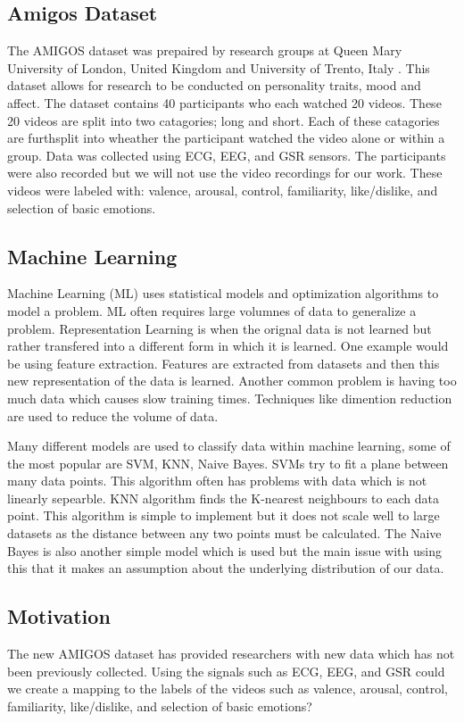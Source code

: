 \subsection{Amigos Dataset}
The AMIGOS dataset was prepaired by research groups at
Queen Mary University of London, United Kingdom and
University of Trento, Italy \cite{AMIGOS:2018}.
This dataset allows for research to be conducted on
personality traits, mood and affect.
The dataset contains 40 participants who each watched 20 videos.
These 20 videos are split into two catagories; long and short.
Each of these catagories are furthsplit into
wheather the participant watched the video alone or within a group.
Data was collected using ECG, EEG, and GSR sensors.
The participants were also recorded but we will not use the video recordings
for our work.
These videos were labeled with:
valence, arousal, control, familiarity, like/dislike,
and selection of basic emotions.

\subsection{Machine Learning}
Machine Learning (ML) uses statistical models and
optimization algorithms to model a problem.
ML often requires large volumnes of data to generalize a problem.
Representation Learning is when the orignal data is not learned
but rather transfered into a different form in which it is learned.
One example would be using feature extraction.
Features are extracted from datasets and then this new representation of the data
is learned.
Another common problem is having too much data which causes slow training times.
Techniques like dimention reduction are used to reduce the volume of
data.

Many different models are used to classify data within machine learning,
some of the most popular are SVM, KNN, Naive Bayes.
SVMs try to fit a plane between many data points.
This algorithm often has problems with data which is not
linearly sepearble.
KNN algorithm finds the K-nearest neighbours to each data point.
This algorithm is simple to implement but it does not scale well
to large datasets as the distance between any two points must be calculated.
The Naive Bayes is also another simple model which is used but the main issue
with using this that it makes an assumption about the underlying distribution of
our data.

\subsection{Motivation}
The new AMIGOS dataset has provided researchers with new
data which has not been previously collected.
Using the signals such as ECG, EEG, and GSR
could we create a mapping to the
labels of the videos such as
valence, arousal, control, familiarity, like/dislike,
and selection of basic emotions?

